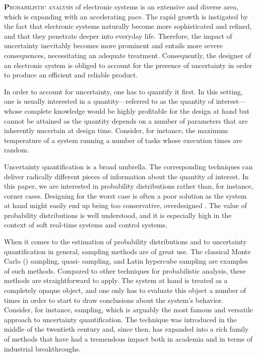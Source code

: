 \lettrine[findent=0.4em, nindent=0em]{\textbf{P}}{robabilistic analysis} of
electronic systems is an extensive and diverse area, which is expanding with an
accelerating pace. The rapid growth is instigated by the fact that electronic
systems naturally become more sophisticated and refined, and that they penetrate
deeper into everyday life. Therefore, the impact of uncertainty inevitably
becomes more prominent and entails more severe consequences, necessitating an
adequate treatment. Consequently, the designer of an electronic system is
obliged to account for the presence of uncertainty in order to produce an
efficient and reliable product.

In order to account for uncertainty, one has to quantify it first. In this
setting, one is usually interested in a quantity---referred to as the quantity
of interest---whose complete knowledge would be highly profitable for the design
at hand but cannot be attained as the quantity depends on a number of parameters
that are inherently uncertain at design time. Consider, for instance, the
maximum temperature of a system running a number of tasks whose execution times
are random.

Uncertainty quantification is a broad umbrella. The corresponding techniques can
deliver radically different pieces of information about the quantity of
interest. In this paper, we are interested in probability distributions rather
than, for instance, corner cases. Designing for the worst case is often a poor
solution as the system at hand might easily end up being too conservative,
overdesigned \cite{quinton2012}. The value of probability distributions is well
understood, and it is especially high in the context of soft real-time systems
and control systems.

When it comes to the estimation of probability distributions and to uncertainty
quantification in general, sampling methods are of great use. The classical
Monte Carlo () sampling, quasi- sampling, and Latin hypercube
sampling are examples of such methods. Compared to other techniques for
probabilistic analysis, these methods are straightforward to apply. The system
at hand is treated as a completely opaque object, and one only has to evaluate
this object a number of times in order to start to draw conclusions about the
system's behavior. Consider, for instance,  sampling, which is arguably
the most famous and versatile approach to uncertainty quantification. The
technique was introduced in the middle of the twentieth century and, since then,
has expanded into a rich family of methods that have had a tremendous impact
both in academia and in terms of industrial breakthroughs.

